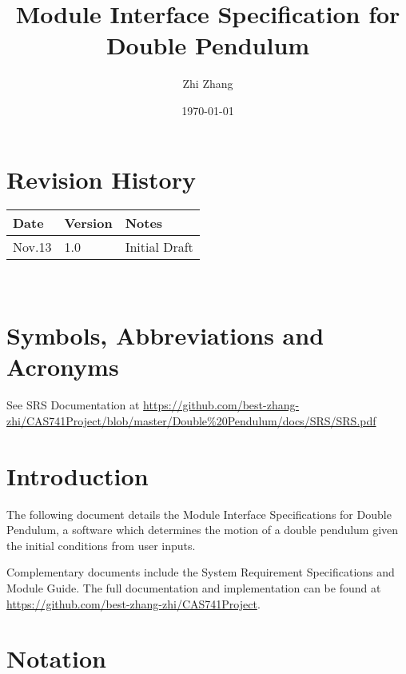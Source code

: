 \documentclass[12pt, titlepage]{article}
\begin{document}
\title{Module Interface Specification for Double Pendulum}

\author{Zhi Zhang}

\date{\today}

\maketitle


\section{Revision History}

\begin{tabularx}{\textwidth}{p{3cm}p{2cm}X}
\toprule {\bf Date} & {\bf Version} & {\bf Notes}\\
\midrule
Nov.13 & 1.0 & Initial Draft\\
\bottomrule
\end{tabularx}

~\newpage

\section{Symbols, Abbreviations and Acronyms}

See SRS Documentation at
\url{https://github.com/best-zhang-zhi/CAS741Project/blob/master/Double%20Pendulum/docs/SRS/SRS.pdf}

\newpage

\tableofcontents

\newpage


\section{Introduction}

The following document details the Module Interface Specifications for Double
Pendulum, a software which determines the motion of a double pendulum given the
initial conditions from user inputs.

Complementary documents include the System Requirement Specifications
and Module Guide.  The full documentation and implementation can be
found at \url{https://github.com/best-zhang-zhi/CAS741Project}.  

\section{Notation}
\end{document}
